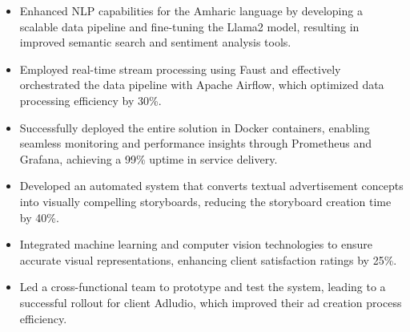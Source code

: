 \documentclass{minimal}
\begin{document}
\begin{adjustwidth}{2em}{0em}
\begin{itemize}
        \item Enhanced NLP capabilities for the Amharic language by developing a scalable data pipeline and fine{-}tuning the Llama2 model, resulting in improved semantic search and sentiment analysis tools.
        \item Employed real{-}time stream processing using Faust and effectively orchestrated the data pipeline with Apache Airflow, which optimized data processing efficiency by 30\%.
        \item Successfully deployed the entire solution in Docker containers, enabling seamless monitoring and performance insights through Prometheus and Grafana, achieving a 99\% uptime in service delivery.
    \end{itemize}
\begin{itemize}
        \item Developed an automated system that converts textual advertisement concepts into visually compelling storyboards, reducing the storyboard creation time by 40\%.
        \item Integrated machine learning and computer vision technologies to ensure accurate visual representations, enhancing client satisfaction ratings by 25\%.
        \item Led a cross{-}functional team to prototype and test the system, leading to a successful rollout for client Adludio, which improved their ad creation process efficiency.
    \end{itemize}
\end{adjustwidth}
\vspace{1em}


\vspace{1em}

\begin{adjustwidth}{2em}{0em}
\end{adjustwidth}
\vspace{1em}







\begin{multicols}{2}
        \columnbreak
        
\end{multicols}
\end{document}
